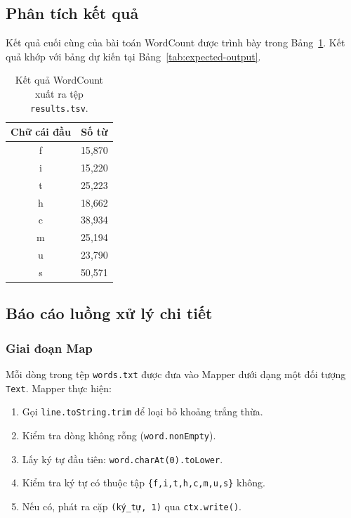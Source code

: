\subsection{Phân tích kết quả}

Kết quả cuối cùng của bài toán WordCount được trình bày trong Bảng~\ref{tab:final-result}. Kết quả khớp với bảng dự kiến tại Bảng~\ref{tab:expected-output}.

\begin{table}[H]
\centering
\caption{Kết quả WordCount xuất ra tệp \texttt{results.tsv}.}
\label{tab:final-result}
\begin{tabular}{cc}
\toprule
\textbf{Chữ cái đầu} & \textbf{Số từ} \\
\midrule
f & 15{,}870 \\
i & 15{,}220 \\
t & 25{,}223 \\
h & 18{,}662 \\
c & 38{,}934 \\
m & 25{,}194 \\
u & 23{,}790 \\
s & 50{,}571 \\
\bottomrule
\end{tabular}
\end{table}


\subsection{Báo cáo luồng xử lý chi tiết}

\subsubsection{Giai đoạn Map}

Mỗi dòng trong tệp \texttt{words.txt} được đưa vào Mapper dưới dạng một đối tượng \texttt{Text}. Mapper thực hiện:
\begin{enumerate}
    \item Gọi \texttt{line.toString.trim} để loại bỏ khoảng trắng thừa.
    \item Kiểm tra dòng không rỗng (\texttt{word.nonEmpty}).
    \item Lấy ký tự đầu tiên: \texttt{word.charAt(0).toLower}.
    \item Kiểm tra ký tự có thuộc tập \texttt{\{f,i,t,h,c,m,u,s\}} không.
    \item Nếu có, phát ra cặp \texttt{(ký\_tự, 1)} qua \texttt{ctx.write()}.
\end{enumerate}

